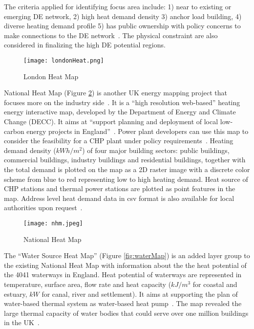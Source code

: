 \documentclass[hidelinks,12pt]{article}
\newcommand{\fref}[1]{Figure \ref{#1}}
\begin{document}
The criteria applied for identifying focus area include: 1) near to
existing or emerging DE network, 2) high heat demand density 3) anchor
load building, 4) diverse heating demand profile 5) has public
ownership with policy concerns to make connections to the DE
network~\cite{decentralHeatMap2011}. The physical constraint are also
considered in finalizing the high DE potential regions.
\begin{figure}[h!]
  \centering
  \texttt{[image: londonHeat.png]}
  \caption{London Heat Map~\cite{londonHeatMapMap}}
  \label{fig:londonHeat}
\end{figure}

National Heat Map (\fref{fig:nhm}) is another UK energy mapping
project that focuses more on the industry
side~\cite{decentralHeatMap2011}. It is a ``high resolution
web-based'' heating energy interactive map, developed by the
Department of Energy and Climate Change (DECC). It aims at ``support
planning and deployment of local low-carbon energy projects in
England''~\cite{heatMap2015}. Power plant developers can use this map
to consider the feasibility for a CHP plant under policy
requirements~\cite{decentralHeatMap2011}. Heating demand density
($kWh/m^2$) of four major building sectors: public buildings,
commercial buildings, industry buildings and residential buildings,
together with the total demand is plotted on the map as a 2D raster
image with a discrete color scheme from blue to red representing low
to high heating demand. Heat source of CHP stations and thermal power
stations are plotted as point features in the map. Address level heat
demand data in csv format is also available for local authorities upon
request~\cite{heatMapLocal2012}.

\begin{figure}[h!]
  \centering
  \texttt{[image: nhm.jpeg]}
  \caption{National Heat Map~\cite{heatMap2012}}
  \label{fig:nhm}
\end{figure}

The ``Water Source Heat Map'' (\fref{fig:waterMap}) is an added layer
group to the existing National Heat Map with information about the the
heat potential of the 4041 waterways in England. Heat potential of
waterways are represented in temperature, surface area, flow rate and
heat capacity ($kJ/m^3$ for coastal and estuary, $kW$ for canal, river
and settlement). It aims at supporting the plan of water-based thermal
system as water-based heat pump~\cite{waterHeatMap}. The map revealed
the large thermal capacity of water bodies that could serve over one
million buildings in the UK~\cite{waterHeatMap}.
\end{document}

